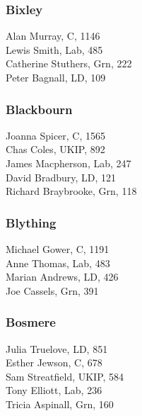 \documentclass[a4paper,openany,10pt]{book}
\begin{document}
\subsubsection*{Bixley}



Alan Murray, C, 1146\\
Lewis Smith, Lab, 485\\
Catherine Stuthers, Grn, 222\\
Peter Bagnall, LD, 109\\


\subsubsection*{Blackbourn}



Joanna Spicer, C, 1565\\
Chas Coles, UKIP, 892\\
James Macpherson, Lab, 247\\
David Bradbury, LD, 121\\
Richard Braybrooke, Grn, 118\\


\subsubsection*{Blything}



Michael Gower, C, 1191\\
Anne Thomas, Lab, 483\\
Marian Andrews, LD, 426\\
Joe Cassels, Grn, 391\\


\subsubsection*{Bosmere}



Julia Truelove, LD, 851\\
Esther Jewson, C, 678\\
Sam Streatfield, UKIP, 584\\
Tony Elliott, Lab, 236\\
Tricia Aspinall, Grn, 160\\
\end{document}
